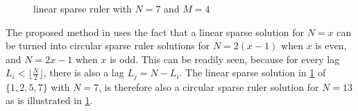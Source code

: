 \documentclass[a4paper, openany, oneside]{memoir}
\begin{document}
\begin{figure}[H]
\centering
{}
\caption{linear sparse ruler with $N=7$ and $M=4$}\label{tkz:linear_sparse_ruler}
\end{figure}

The proposed method in \cite{ariananda2012compressive} uses the fact that a linear sparse solution for $N=x$ can be turned into circular sparse ruler solutions for $N=2(x-1)$ when $x$ is even, and $N=2x-1$ when $x$ is odd. This can be readily seen, because for every lag $L_i<\lfloor\frac{N}{2}\rfloor$, there is also a lag $L_j = N-L_i$. The linear sparse solution in \cref{tkz:linear_sparse_ruler} of $\{1,2,5,7\}$ with $N=7$, is therefore also a circular sparse ruler solution for $N=13$ as is illustrated in \cref{tkz:linear_sparse_ruler}. 
\end{document}
